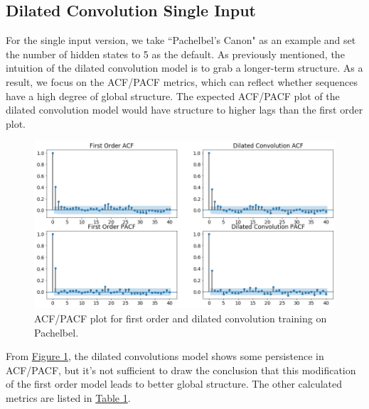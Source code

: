 \documentclass[10pt, oneside]{article}
\begin{document}
\subsection{Dilated Convolution Single Input}
For the single input version, we take ``Pachelbel's Canon" as an example and set the number of hidden states to 5 as the default. As previously mentioned, the intuition of the dilated convolution model is to grab a longer-term structure. As a result, we focus on the ACF/PACF metrics, which can reflect whether sequences have a high degree of global structure. The expected ACF/PACF plot of the dilated convolution model would have structure to higher lags than the first order plot.
\begin{figure}[H]

  \includegraphics[width=\linewidth]{ACF.png}

  \label{fig: ACF}
    \caption{ACF/PACF plot for first order and dilated convolution training on Pachelbel.}
\end{figure}

From \hyperref[fig: ACF]{Figure 1}, the dilated convolutions model shows some persistence in ACF/PACF, but it's not sufficient to draw the conclusion that this modification of the first order model leads to better global structure. 
The other calculated metrics are listed in \hyperref[table:metrics]{Table 1}. 
\\
\end{document}
